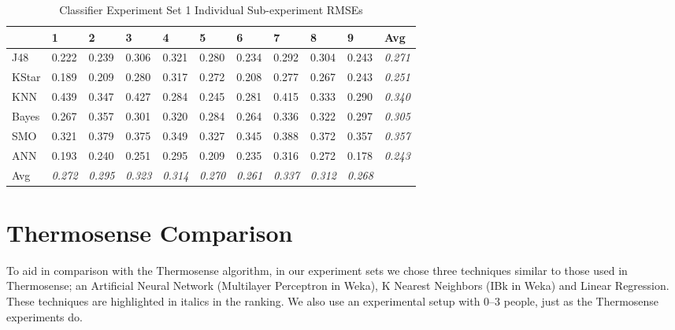 \documentclass[../thesis/thesis.tex]{subfiles}
\begin{document}
\begin{landscape}
\begin{table}
\centering
\begin{tabular}{|l|l|l|l|l|l|l|l|l|l|l|}
\hline
      & \textbf{1}     & \textbf{2}     & \textbf{3}     & \textbf{4}     & \textbf{5}     & \textbf{6}     & \textbf{7}     & \textbf{8}     & \textbf{9}     & \textbf{Avg}   \\ \hline
J48   & 0.222          & 0.239          & 0.306          & 0.321          & 0.280          & 0.234          & 0.292          & 0.304          & 0.243          & \textit{0.271} \\ \hline
KStar & 0.189          & 0.209          & 0.280          & 0.317          & 0.272          & 0.208          & 0.277          & 0.267          & 0.243          & \textit{0.251} \\ \hline
KNN   & 0.439          & 0.347          & 0.427          & 0.284          & 0.245          & 0.281          & 0.415          & 0.333          & 0.290          & \textit{0.340} \\ \hline
Bayes & 0.267          & 0.357          & 0.301          & 0.320          & 0.284          & 0.264          & 0.336          & 0.322          & 0.297          & \textit{0.305} \\ \hline
SMO   & 0.321          & 0.379          & 0.375          & 0.349          & 0.327          & 0.345          & 0.388          & 0.372          & 0.357          & \textit{0.357} \\ \hline
ANN   & 0.193          & 0.240          & 0.251          & 0.295          & 0.209          & 0.235          & 0.316          & 0.272          & 0.178          & \textit{0.243} \\ \hline
Avg   & \textit{0.272} & \textit{0.295} & \textit{0.323} & \textit{0.314} & \textit{0.270} & \textit{0.261} & \textit{0.337} & \textit{0.312} & \textit{0.268} &                \\ \hline
\end{tabular}
\caption{Classifier Experiment Set 1 Individual Sub-experiment RMSEs}
\label{tab:results:set1rmse}
\end{table}
\end{landscape}

\section{Thermosense Comparison}

To aid in comparison with the Thermosense algorithm, in our experiment sets we chose three techniques similar to those used in Thermosense; an Artificial Neural Network (Multilayer Perceptron in Weka), K Nearest Neighbors (IBk in Weka) and Linear Regression. These techniques are highlighted in italics in the  ranking. We also use an experimental setup with 0--3 people, just as the Thermosense experiments do.
\end{document}

